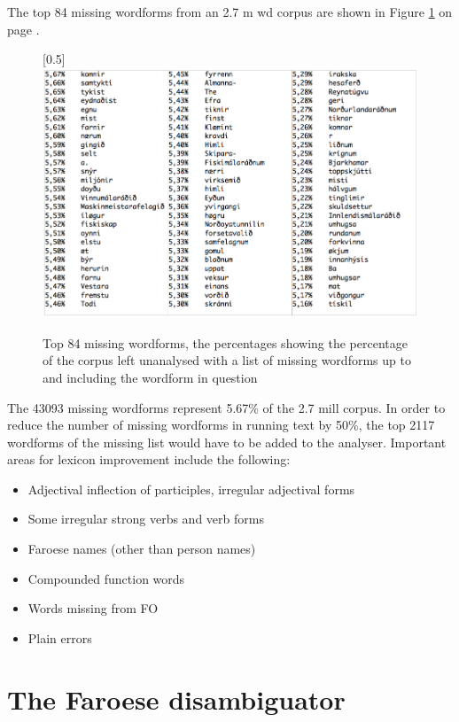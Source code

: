 \documentclass[11pt]{article}
\begin{document}
The top 84 missing wordforms from an 2.7 m wd corpus are shown in Figure \ref{84miss} on page \pageref{84miss}. 

\begin{figure}[htbp]
\begin{center}
\scalebox{0.5}[0.5]{\includegraphics{img/missing.png}}
\caption{Top 84 missing wordforms, the percentages showing the percentage of the corpus left unanalysed with a list of missing wordforms up to and including the wordform in question}
\label{84miss}
\end{center}
\end{figure}


The 43093 missing wordforms represent 5.67\% of the 2.7 mill corpus. In order to reduce the number of missing wordforms in running text by 50\%, the top 2117 wordforms of the missing list would have to be added to the analyser. Important areas for lexicon improvement include the following:

\begin{itemize}
\setlength{\itemsep}{-0.2cm}
\item Adjectival inflection of participles, irregular adjectival forms
\item Some irregular strong verbs and verb forms
\item Faroese names (other than person names)
\item Compounded function words
\item Words missing from FO
\item Plain errors
\end{itemize}




\section{The Faroese disambiguator}
\end{document}
